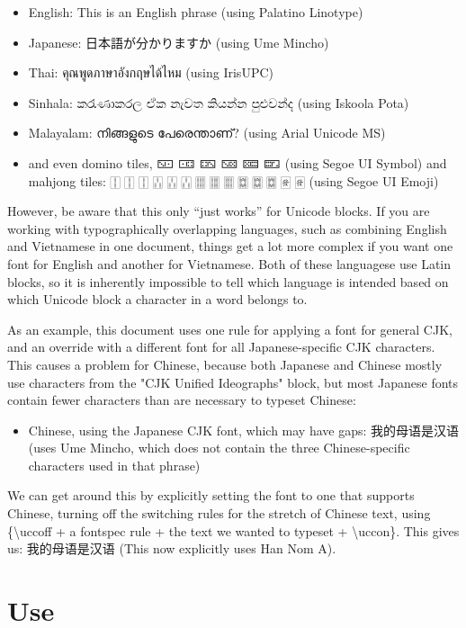 \documentclass{article}
\newenvironment{itemlist}{%
  \begin{itemize}
	\setlength{\itemsep}{0pt}
	\setlength{\parsep}{0pt}
	\setlength{\topsep}{0pt}
	\setlength{\partopsep}{0pt}
	\setlength{\parskip}{0pt}
	\setlength{\labelsep}{5pt}}%
{
  \end{itemize}}
\begin{document}
		\begin{itemlist}
			\item English: This is an English phrase (using Palatino Linotype)
			\item Japanese: 日本語が分かりますか (using Ume Mincho)
			\item Thai: คุณพูดภาษาอังกฤษได้ไหม (using IrisUPC)
			\item Sinhala: කරැණාකරල ඒක නැවත කියන්න පුළුවන්ද (using Iskoola Pota)
			\item Malayalam: നിങ്ങളുടെ പേരെന്താണ്? (using Arial Unicode MS)
			\item and even domino tiles, 🁇 🀼 🁐 🁋 🁚 🁝 (using Segoe UI Symbol) and mahjong tiles: 🀑 🀑 🀑 🀒 🀒 🀒 🀕 🀕 🀕 🀗 🀗 🀗 🀅 🀅 (using Segoe UI Emoji)
		\end{itemlist}

		However, be aware that this only “just works” for Unicode blocks. If you are working with typographically overlapping languages, such as combining English and Vietnamese in one document, things get a lot more complex if you want one font for English and another for Vietnamese. Both of these languagese use Latin blocks, so it is inherently impossible to tell which language is intended based on which Unicode block a character in a word belongs to.

		As an example, this document uses one rule for applying a font for general CJK, and an override with a different font for all Japanese-specific CJK characters. This causes a problem for Chinese, because both Japanese and Chinese mostly use characters from the "CJK Unified Ideographs" block, but most Japanese fonts contain fewer characters than are necessary to typeset Chinese:

    \begin{itemlist}
			\item Chinese, using the Japanese CJK font, which may have gaps: 我的母语是汉语 (uses Ume Mincho, which does not contain the three Chinese-specific characters used in that phrase)
    \end{itemlist}

  We can get around this by explicitly setting the font to one that supports Chinese, turning off the switching rules for the stretch of Chinese text, using \{\textbackslash uccoff + a fontspec rule + the text we wanted to typeset + \textbackslash uccon\}. This gives us: {\uccoff {} 我的母语是汉语 \uccon} (This now explicitly uses Han Nom A).

	\section{Use}
\end{document}
